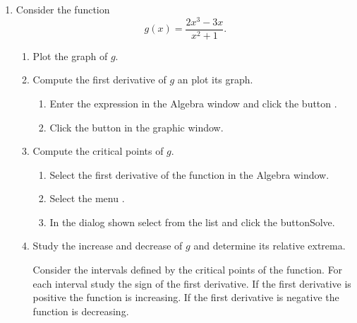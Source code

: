 \begin{enumerate}[leftmargin=*]
\item Consider the function
\[
g(x)=\dfrac{2x^{3}-3x}{x^{2}+1}.
\]

\begin{enumerate}
\item  Plot the graph of $g$.

\item Compute the first derivative of $g$ an plot its graph.
\begin{indication}
\begin{enumerate}
\item Enter the expression  in the Algebra window and click the button .
\item Click the button  in the graphic window.
\end{enumerate}
\end{indication}

\item Compute the critical points of $g$.
\begin{indication}
\begin{enumerate}
\item Select the first derivative of the function in the Algebra window.
\item Select the menu .
\item In the dialog shown select  from the  list and click the button{Solve}.
\end{enumerate}
\end{indication}

\item Study the increase and decrease of $g$ and determine its relative extrema.
\begin{indication}
Consider the intervals defined by the critical points of the function.
For each interval study the sign of the first derivative.
If the first derivative is positive the function is increasing.
If the first derivative is negative the function is decreasing.


\end{indication}
\end{enumerate}
\end{enumerate}

